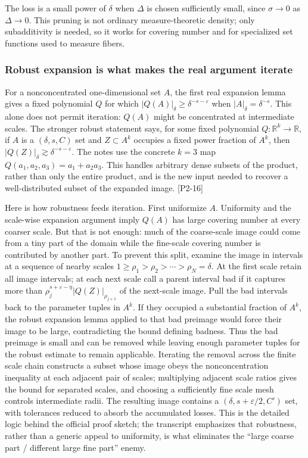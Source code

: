 The loss is a small power of \(\delta\) when \(\Delta\) is chosen sufficiently small, since \(\sigma\to0\) as \(\Delta\to0\). This pruning is not ordinary measure-theoretic density; only subadditivity is needed, so it works for covering number and for specialized set functions used to measure fibers.

\subsubsection{Robust expansion is what makes the real argument iterate}\label{04-visual-computing-ii-ch033-robust-expansion-is-what-makes-the-real-argument-iterate}

For a nonconcentrated one-dimensional set \(A\), the first real expansion lemma gives a fixed polynomial \(Q\) for which \(|Q(A)|_\delta\ge\delta^{-s-\varepsilon}\) when \(|A|_\delta=\delta^{-s}\). This alone does not permit iteration: \(Q(A)\) might be concentrated at intermediate scales. The stronger robust statement says, for some fixed polynomial \(Q:\mathbb R^k\to\mathbb R\), if \(A\) is a \((\delta,s,C)\) set and \(Z\subset A^k\) occupies a fixed power fraction of \(A^k\), then \(|Q(Z)|_\delta\gtrsim\delta^{-s-\varepsilon}\). The notes use the concrete \(k=3\) map \(Q(a_1,a_2,a_3)=a_1+a_2a_3\). This handles arbitrary dense subsets of the product, rather than only the entire product, and is the new input needed to recover a well-distributed subset of the expanded image. {[}P2-16{]}

Here is how robustness feeds iteration. First uniformize \(A\). Uniformity and the scale-wise expansion argument imply \(Q(A)\) has large covering number at every coarser scale. But that is not enough: much of the coarse-scale image could come from a tiny part of the domain while the fine-scale covering number is contributed by another part. To prevent this split, examine the image in intervals at a sequence of nearby scales \(1\ge\rho_1>\rho_2>\cdots>\rho_N=\delta\). At the first scale retain all image intervals; at each next scale call a parent interval bad if it captures more than \(\rho_j^{s+\varepsilon-\eta}|Q(Z)|_{\rho_{j+1}}\) of the next-scale image. Pull the bad intervals back to the parameter tuples in \(A^k\). If they occupied a substantial fraction of \(A^k\), the robust expansion lemma applied to that bad preimage would force their image to be large, contradicting the bound defining badness. Thus the bad preimage is small and can be removed while leaving enough parameter tuples for the robust estimate to remain applicable. Iterating the removal across the finite scale chain constructs a subset whose image obeys the nonconcentration inequality at each adjacent pair of scales; multiplying adjacent scale ratios gives the bound for separated scales, and choosing a sufficiently fine scale mesh controls intermediate radii. The resulting image contains a \((\delta,s+\varepsilon/2,C')\) set, with tolerances reduced to absorb the accumulated losses. This is the detailed logic behind the official proof sketch; the transcript emphasizes that robustness, rather than a generic appeal to uniformity, is what eliminates the ``large coarse part / different large fine part'' enemy.

